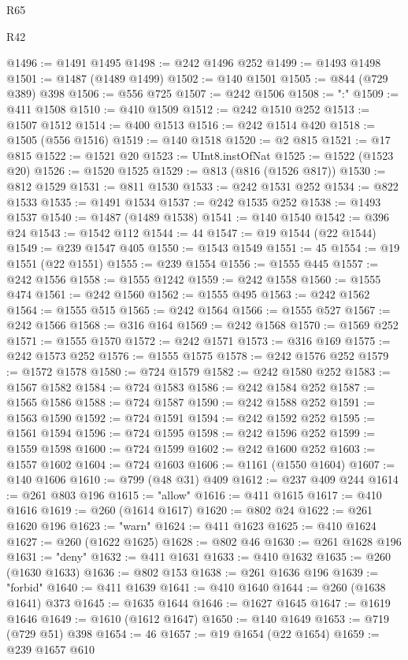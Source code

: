 \begin{lexlean}{R65}
\begin{lexlean}{R42}
\begin{coremodule}
{{{{{{{{{{{{{{{{{{{{{{{{{{{{{{{{{{{{{{{{{{{{{{{{{{{{{{{{{{{{{{{{{{{{{{{{{{{{{{{{{{{{{{{{{{{{{{{{{{{{{{{{{{{{{{{{{{{{{{{{{{{{{{{{{{{{{{{{{{{{{{{{{{{{{{{{{{{{{{{{{{{{{{{{{{{{{{{{{{{{{{{@1496 := @1491 @1495
@1498 := @242 @1496 @252
@1499 := @1493 @1498
@1501 := @1487 (@1489 @1499)
@1502 := @140 @1501
@1505 := @844 (@729 @389) @398
@1506 := @556 @725
@1507 := @242 @1506
@1508 := ":"
@1509 := @411 @1508
@1510 := @410 @1509
@1512 := @242 @1510 @252
@1513 := @1507 @1512
@1514 := @400 @1513
@1516 := @242 @1514 @420
@1518 := @1505 (@556 @1516)
@1519 := @140 @1518
@1520 := @2 @815
@1521 := @17 @815
@1522 := @1521 @20
@1523 := UInt8.instOfNat
@1525 := @1522 (@1523 @20)
@1526 := @1520 @1525
@1529 := @813 (@816 (@1526 @817))
@1530 := @812 @1529
@1531 := @811 @1530
@1533 := @242 @1531 @252
@1534 := @822 @1533
@1535 := @1491 @1534
@1537 := @242 @1535 @252
@1538 := @1493 @1537
@1540 := @1487 (@1489 @1538)
@1541 := @140 @1540
@1542 := @396 @24
@1543 := @1542 @112
@1544 := 44
@1547 := @19 @1544 (@22 @1544)
@1549 := @239 @1547 @405
@1550 := @1543 @1549
@1551 := 45
@1554 := @19 @1551 (@22 @1551)
@1555 := @239 @1554
@1556 := @1555 @445
@1557 := @242 @1556
@1558 := @1555 @1242
@1559 := @242 @1558
@1560 := @1555 @474
@1561 := @242 @1560
@1562 := @1555 @495
@1563 := @242 @1562
@1564 := @1555 @515
@1565 := @242 @1564
@1566 := @1555 @527
@1567 := @242 @1566
@1568 := @316 @164
@1569 := @242 @1568
@1570 := @1569 @252
@1571 := @1555 @1570
@1572 := @242 @1571
@1573 := @316 @169
@1575 := @242 @1573 @252
@1576 := @1555 @1575
@1578 := @242 @1576 @252
@1579 := @1572 @1578
@1580 := @724 @1579
@1582 := @242 @1580 @252
@1583 := @1567 @1582
@1584 := @724 @1583
@1586 := @242 @1584 @252
@1587 := @1565 @1586
@1588 := @724 @1587
@1590 := @242 @1588 @252
@1591 := @1563 @1590
@1592 := @724 @1591
@1594 := @242 @1592 @252
@1595 := @1561 @1594
@1596 := @724 @1595
@1598 := @242 @1596 @252
@1599 := @1559 @1598
@1600 := @724 @1599
@1602 := @242 @1600 @252
@1603 := @1557 @1602
@1604 := @724 @1603
@1606 := @1161 (@1550 @1604)
@1607 := @140 @1606
@1610 := @799 (@48 @31) @409
@1612 := @237 @409 @244
@1614 := @261 @803 @196
@1615 := "allow"
@1616 := @411 @1615
@1617 := @410 @1616
@1619 := @260 (@1614 @1617)
@1620 := @802 @24
@1622 := @261 @1620 @196
@1623 := "warn"
@1624 := @411 @1623
@1625 := @410 @1624
@1627 := @260 (@1622 @1625)
@1628 := @802 @46
@1630 := @261 @1628 @196
@1631 := "deny"
@1632 := @411 @1631
@1633 := @410 @1632
@1635 := @260 (@1630 @1633)
@1636 := @802 @153
@1638 := @261 @1636 @196
@1639 := "forbid"
@1640 := @411 @1639
@1641 := @410 @1640
@1644 := @260 (@1638 @1641) @373
@1645 := @1635 @1644
@1646 := @1627 @1645
@1647 := @1619 @1646
@1649 := @1610 (@1612 @1647)
@1650 := @140 @1649
@1653 := @719 (@729 @51) @398
@1654 := 46
@1657 := @19 @1654 (@22 @1654)
@1659 := @239 @1657 @610
}}}}}}}}}}}}}}}}}}}}}}}}}}}}}}}}}}}}}}}}}}}}}}}}}}}}}}}}}}}}}}}}}}}}}}}}}}}}}}}}}}}}}}}}}}}}}}}}}}}}}}}}}}}}}}}}}}}}}}}}}}}}}}}}}}}}}}}}}}}}}}}}}}}}}}}}}}}}}}}}}}}}}}}}}}}}}}}}}}}}}}}
\end{coremodule}
\end{lexlean}
\end{lexlean}
